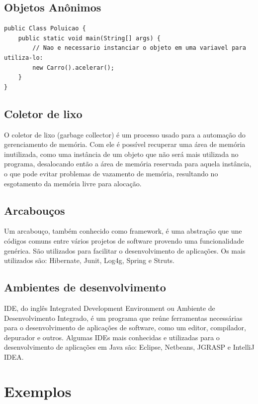 \documentclass[
	12pt,				%
	openright,			%
	oneside,			%
	a4paper,			%
	english,			%
	french,				%
	spanish,			%
	brazil				%
	]{abntex2}
\begin{document}
\section{Objetos Anônimos}

\begin{lstlisting}
public Class Poluicao {
	public static void main(String[] args) {
		// Nao e necessario instanciar o objeto em uma variavel para utiliza-lo:
		new Carro().acelerar();
	}
}
\end{lstlisting}

\section{Coletor de lixo}

O coletor de lixo (garbage collector) é um processo usado para a automação do
gerenciamento de memória. Com ele é possível recuperar uma área de memória inutilizada,
como uma instância de um objeto que não será mais utilizada no programa, desalocando
então a área de memória reservada para aquela instância, o que pode evitar problemas de
vazamento de memória, resultando no esgotamento da memória livre para alocação.

\section{Arcabouços}

Um arcabouço, também conhecido como framework, é uma abstração que une
códigos comuns entre vários projetos de software provendo uma funcionalidade genérica.
São utilizados para facilitar o desenvolvimento de aplicações. Os mais utilizados são:
Hibernate, Junit, Log4g, Spring e Struts.

\section{Ambientes de desenvolvimento}

IDE, do inglês Integrated Development Environment ou Ambiente de
Desenvolvimento Integrado, é um programa que reúne ferramentas necessárias para o
desenvolvimento de aplicações de software, como um editor, compilador, depurador e
outros. Algumas IDEs mais conhecidas e utilizadas para o desenvolvimento de aplicações
em Java são: Eclipse, Netbeans, JGRASP e IntelliJ IDEA.

{\let\clearpage\relax \chapter[Exemplos]{Exemplos}}
\end{document}

